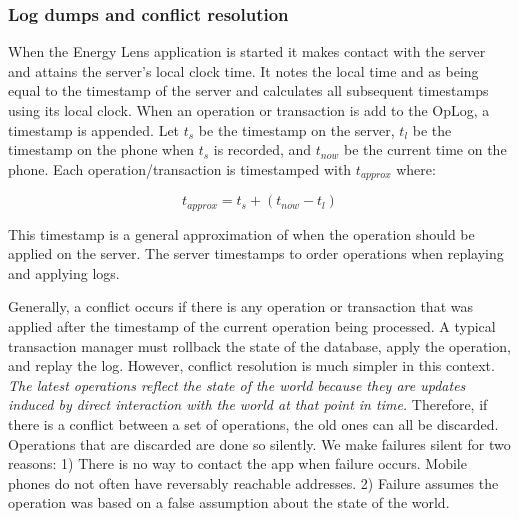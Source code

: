 \subsubsection{Log dumps and conflict resolution}
\label{sec:conflicts}
When the Energy Lens application is started it makes contact with the server and attains the server's local clock time. 
It notes the local time and as being equal to the timestamp of the server and calculates all subsequent timestamps
using its local clock.  When an operation or transaction is add to the OpLog, a timestamp is appended.  Let $t_s$ be the timestamp 
on the server, $t_l$ be the timestamp on the phone when $t_s$ is recorded, and $t_{now}$ be the current time on the phone.  
Each operation/transaction is timestamped with $t_{approx}$ where:

\begin{equation}
t_{approx} = t_s + (t_{now} - t_l)
\end{equation}


This timestamp is a general approximation of when the operation should be applied on the server.  The server timestamps
to order operations when replaying and applying logs.

Generally, a conflict occurs if there is any operation or transaction that was applied after the timestamp of the current operation
being processed.  A typical transaction manager must rollback the state of the database, apply the operation, and replay
the log.  However, conflict resolution is much simpler in this context.  \emph{The latest operations reflect the state of the
world because they are updates induced by direct interaction with the world at that point in time.}  Therefore, if there is a conflict
between a set of operations, the old ones can all be discarded.
Operations that are discarded are done so silently.  We make failures silent for two reasons: 1) There is no way to contact the app when 
failure occurs.  Mobile phones
do not often have reversably reachable addresses.  2) Failure assumes the operation was based on a false assumption about the state
of the world.  


